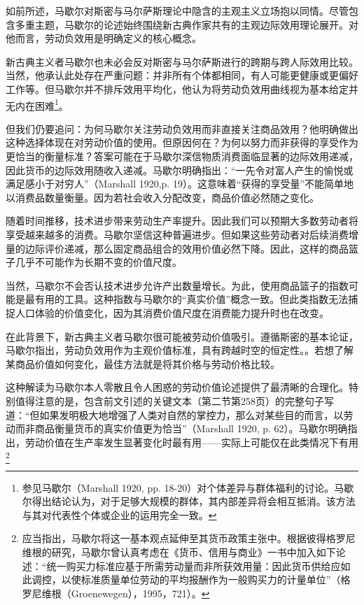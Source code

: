 \begin{translation}
如前所述，马歇尔对斯密与马尔萨斯理论中隐含的主观主义立场抱以同情。尽管包含多重主题，马歇尔的论述始终围绕新古典作家共有的主观边际效用理论展开。对他而言，劳动负效用是明确定义的核心概念。

新古典主义者马歇尔也未必会反对斯密与马尔萨斯进行的跨期与跨人际效用比较。当然，他承认此处存在严重问题：并非所有个体都相同，有人可能更健康或更偏好工作等。但马歇尔并不排斥效用平均化，他认为将劳动负效用曲线视为基本给定并无内在困难\footnote{参见马歇尔（Marshall 1920, pp. 18-20）对个体差异与群体福利的讨论。马歇尔得出结论认为，对于足够大规模的群体，其内部差异将会相互抵消。该方法与其对代表性个体或企业的运用完全一致。}。

但我们仍要追问：为何马歇尔关注劳动负效用而非直接关注商品效用？他明确做出这种选择体现在对劳动价值的使用。但原因何在？为何以努力而非获得的享受作为更恰当的衡量标准？答案可能在于马歇尔深信物质消费面临显著的边际效用递减，因此货币的边际效用随收入递减。马歇尔明确指出：“一先令对富人产生的愉悦或满足感小于对穷人”（Marshall 1920,p. 19）。这意味着“获得的享受量”不能简单地以消费品数量衡量。因为若社会收入分配改变，商品价值必然随之变化。

随着时间推移，技术进步带来劳动生产率提升。因此我们可以预期大多数劳动者将享受越来越多的消费。马歇尔坚信这种普遍进步。但如果这些劳动者对后续消费增量的边际评价递减，那么固定商品组合的效用价值必然下降。因此，这样的商品篮子几乎不可能作为长期不变的价值尺度。

当然，马歇尔不会否认技术进步允许产出数量增长。为此，使用商品篮子的指数可能是最有用的工具。这种指数与马歇尔的“真实价值”概念一致。但此类指数无法捕捉人口体验的价值变化，因为其消费价值尺度在消费能力提升时也在改变。

在此背景下，新古典主义者马歇尔很可能被劳动价值吸引。遵循斯密的基本论证，马歇尔指出，劳动负效用作为主观价值标准，具有跨越时空的恒定性。。若想了解某商品价值如何变化，最佳方法就是将其价格与劳动价格比较。

这种解读为马歇尔本人零散且令人困惑的劳动价值论述提供了最清晰的合理化。特别值得注意的是，包含前文引述的关键文本（第二节第258页）的完整句子写道：“但如果发明极大地增强了人类对自然的掌控力，那么对某些目的而言，以劳动而非商品衡量货币的真实价值更为恰当”（Marshall 1920, p. 62）。马歇尔明确指出，劳动价值在生产率发生显著变化时最有用——实际上可能仅在此类情况下有用\footnote{应当指出，马歇尔将这一基本观点延伸至其货币政策主张中。根据彼得格罗尼维根的研究，马歇尔曾认真考虑在《货币、信用与商业》一书中加入如下论述：​“统一购买力标准应基于所需劳动量而非所获效用量：因此货币供给应如此调控，以使标准质量单位劳动的平均报酬作为一般购买力的计量单位”（格罗尼维根（Groenewegen），1995，721）。 

}
\end{translation}
